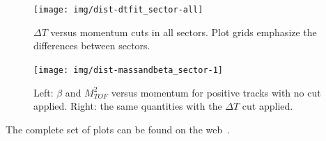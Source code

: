 \clearpage\newpage

\begin{figure}[ht]
    \centering
    \texttt{[image: img/dist-dtfit\_sector-all]}
    \caption{$\Delta T$ versus momentum cuts in all sectors. Plot grids
    emphasize the differences between sectors.}
    \label{fig:dt_vs_mom_all_sectors}
\end{figure}

\clearpage\newpage

\begin{figure}[ht]
    \centering
    \texttt{[image: img/dist-massandbeta\_sector-1]}
    \caption{Left: $\beta$ and $M_{TOF}^2$ versus momentum for positive
    tracks with no cut applied. Right: the same quantities with the
        $\Delta T$ cut applied.}
    \label{fig:mass_beta_vs_p_sect5}
\end{figure}

The complete set of plots can be found on the web~\cite{bib:pi0_resonance_id_proton}.


\clearpage







